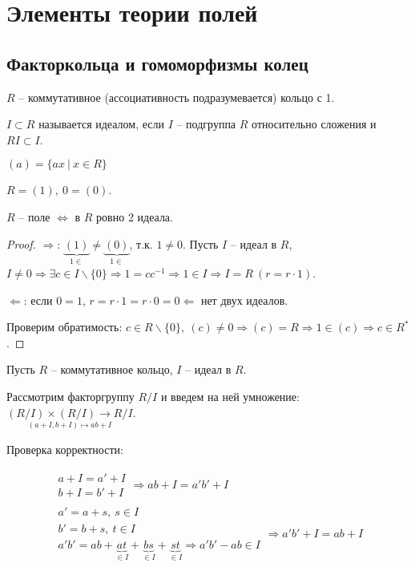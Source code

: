 \documentclass[main]{subfiles}
\begin{document}
\part{ Элементы теории полей}

\chapter{Факторкольца и гомоморфизмы колец}

$R$ -- коммутативное (ассоциативность подразумевается) кольцо с 1. 

$I \subset R$ называется идеалом, если $I$ -- подгруппа $R$ относительно сложения и $RI \subset I$.

$(a) = \{ax \ |\ x \in R\}$

$R = (1), \ 0 = (0)$.

\begin{proposition}
    $R$ -- поле $\Leftrightarrow$ в $R$ ровно 2 идеала.
\end{proposition}

\begin{proof}
    $\Rightarrow$: $\underbrace{(1)}_{1 \in} \neq \underbrace{(0)}_{1 \in}$, т.к. $1 \neq 0$.
    Пусть $I$ -- идеал в $R$, $I \neq 0 \Rightarrow \exists c \in I \backslash \{ 0\} 
    \Rightarrow 1 = c c^{-1} \Rightarrow 1 \in I \Rightarrow I = R \ (r = r \cdot 1) $.

    $\Leftarrow$: если $0 = 1$, $r = r \cdot 1 = r \cdot 0 = 0 \Leftarrow$ нет двух идеалов.
    
    Проверим обратимость: $c \in R \backslash \{ 0\}, \ (c) \neq 0 \Rightarrow
    (c) = R \Rightarrow 1 \in (c) \Rightarrow c \in R^*$. 
\end{proof}

Пусть $R$ -- коммутативное кольцо, $I$ -- идеал в $R$.

Рассмотрим факторгруппу $R/I$ и введем на ней умножение: \\ $\underset{(a+I, b+I) \mapsto ab+I}{(R/I)\times(R/I) \rightarrow R/I}$.

Проверка корректности:

\begin{gather*}
    \begin{gathered}
        a + I = a' + I \\
        b + I = b' + I 
    \end{gathered} \Rightarrow ab +I = a'b' +I \\
    \begin{gathered}
        a'= a + s, \ s\in I \\
        b'= b + s, \ t\in I \\
        a'b' = ab + \underbrace{at}_{\in I} + \underbrace{bs}_{\in I} + \underbrace{st}_{\in I}  \Rightarrow a'b' - ab \in I
    \end{gathered} \Rightarrow a'b' + I = ab +I
\end{gather*}
\end{document}
